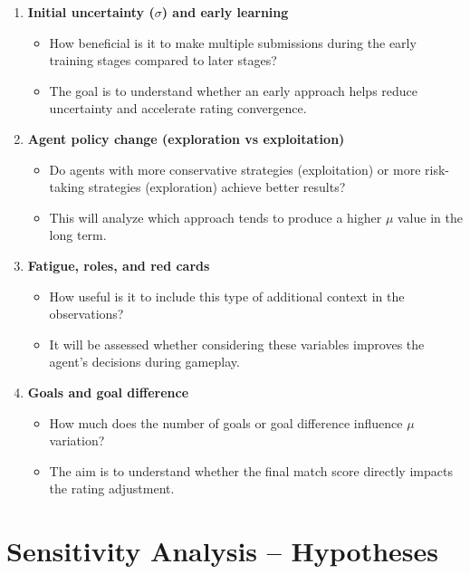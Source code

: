 \begin{enumerate}
    \item \textbf{Initial uncertainty ($\sigma$) and early learning}
    \begin{itemize}
        \item How beneficial is it to make multiple submissions during the early training stages compared to later stages?
        \item The goal is to understand whether an early approach helps reduce uncertainty and accelerate rating convergence.
    \end{itemize}

    \item \textbf{Agent policy change (exploration vs exploitation)}
    \begin{itemize}
        \item Do agents with more conservative strategies (exploitation) or more risk-taking strategies (exploration) achieve better results?
        \item This will analyze which approach tends to produce a higher $\mu$ value in the long term.
    \end{itemize}

    \item \textbf{Fatigue, roles, and red cards}
    \begin{itemize}
        \item How useful is it to include this type of additional context in the observations?
        \item It will be assessed whether considering these variables improves the agent’s decisions during gameplay.
    \end{itemize}

    \item \textbf{Goals and goal difference}
    \begin{itemize}
        \item How much does the number of goals or goal difference influence $\mu$ variation?
        \item The aim is to understand whether the final match score directly impacts the rating adjustment.
    \end{itemize}
\end{enumerate}

\section*{Sensitivity Analysis – Hypotheses}

